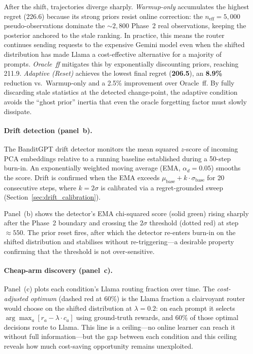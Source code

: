 After the shift, trajectories diverge sharply.
\emph{Warmup-only} accumulates the highest regret (226.6) because its
strong priors resist online correction: the $n_{\mathrm{eff}}{=}5{,}000$
pseudo-observations dominate the ${\sim}2{,}800$ Phase~2 real
observations, keeping the posterior anchored to the stale ranking.
In practice, this means the router continues sending requests to the
expensive Gemini model even when the shifted distribution has made
Llama a cost-effective alternative for a majority of prompts.
\emph{Oracle~ff} mitigates this by exponentially discounting priors,
reaching 211.9.
\emph{Adaptive (Reset)} achieves the lowest final regret
(\textbf{206.5}), an \textbf{8.9\%} reduction vs.\ Warmup-only
and a 2.5\% improvement over Oracle~ff.
By fully discarding stale statistics at the detected change-point,
the adaptive condition avoids the ``ghost prior'' inertia that even
the oracle forgetting factor must slowly dissipate.

\paragraph{Drift detection (panel~b).}
The BanditGPT drift detector monitors the mean squared $z$-score
of incoming PCA embeddings relative to a running baseline established
during a 50-step burn-in.  An exponentially weighted moving average
(EMA, $\alpha_d{=}0.05$) smooths the score.  Drift is confirmed when
the EMA exceeds $\mu_{\mathrm{base}} + k \cdot \sigma_{\mathrm{base}}$
for 20 consecutive steps, where $k{=}2\sigma$ is calibrated via a
regret-grounded sweep (Section~\ref{sec:drift_calibration}).

Panel~(b) shows the detector's EMA chi-squared score (solid green) rising
sharply after the Phase~2 boundary and crossing the $2\sigma$ threshold
(dotted red) at step~${\approx}550$.  The prior reset fires, after which
the detector re-enters burn-in on the shifted distribution and
stabilises without re-triggering---a desirable property confirming
that the threshold is not over-sensitive.

\paragraph{Cheap-arm discovery (panel~c).}
Panel~(c) plots each condition's Llama routing fraction over time.
The \emph{cost-adjusted optimum} (dashed red at 60\%) is the Llama
fraction a clairvoyant router would choose on the shifted distribution
at $\lambda{=}0.2$: on each prompt it selects
$\arg\max_a [r_a - \lambda \cdot c_a]$ using ground-truth rewards,
and 60\% of those optimal decisions route to Llama.
This line is a ceiling---no online learner can reach it without full
information---but the gap between each condition and this ceiling
reveals how much cost-saving opportunity remains unexploited.

